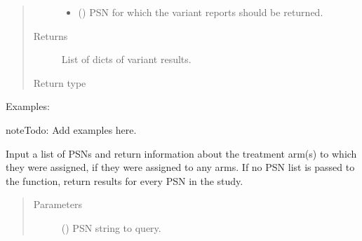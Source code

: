 \documentclass[letterpaper,10pt,english]{sphinxmanual}
\begin{document}
\begin{fulllineitems}
\begin{fulllineitems}
\begin{quote}
\begin{description}
\begin{itemize}
\item {} 
 () \textendash{} PSN for which the variant reports should be returned.

\end{itemize}

\item[{Returns}] \leavevmode

List of dicts of variant results.

%
\begin{sphinxVerbatim}[commandchars=\\\{\}]
 
      \PYG{p}{[}\PYG{p}{]}
      \PYG{p}{[}\PYG{p}{]} 
\end{sphinxVerbatim}


\item[{Return type}] \leavevmode
{}

\end{description}\end{quote}

Examples:

\begin{sphinxadmonition}{note}{\label{matchbox_api_utils:index-2}Todo:}
Add examples here.
\end{sphinxadmonition}

\end{fulllineitems}


\begin{fulllineitems}
\label{\detokenize{matchbox_api_utils:matchbox_api_utils.match_data.MatchData.get_patient_ta_status}}
Input a list of PSNs and return information about the treatment arm(s)
to which they were assigned, if they were assigned to any arms. If no PSN
list is passed to the function, return results for every PSN in the study.
\begin{quote}\begin{description}
\item[{Parameters}] \leavevmode
{} () \textendash{} PSN string to query.


\end{description}
\end{quote}
\end{fulllineitems}
\end{fulllineitems}
\end{document}

